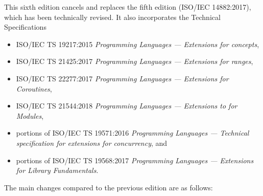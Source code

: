 This sixth edition cancels and replaces the fifth edition
(ISO/IEC 14882:2017), which has been technically revised.
It also incorporates the Technical Specifications
\begin{itemize}
\item ISO/IEC TS 19217:2015 \textit{Programming Languages --- \Cpp{} Extensions for concepts},
\item ISO/IEC TS 21425:2017 \textit{Programming Languages --- \Cpp{} Extensions for ranges},
\item ISO/IEC TS 22277:2017 \textit{Programming Languages --- \Cpp{} Extensions for Coroutines},
\item ISO/IEC TS 21544:2018 \textit{Programming Languages --- Extensions to \Cpp{} for Modules},
\item portions of ISO/IEC TS 19571:2016 \textit{Programming Languages --- Technical specification for \Cpp{} extensions for concurrency}, and %
\item portions of ISO/IEC TS 19568:2017 \textit{Programming Languages --- \Cpp{} Extensions for Library Fundamentals}.
\end{itemize}

The main changes compared to the previous edition are as follows:

